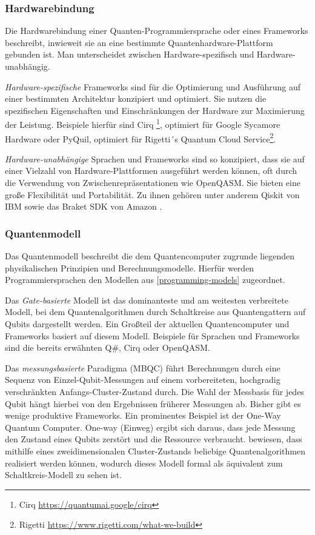 \subsubsection*{Hardwarebindung}

Die Hardwarebindung einer Quanten-Pro\-gram\-mier\-sprache oder eines Frameworks beschreibt, inwieweit sie an eine bestimmte Quanten\-hardware-Plattform gebunden ist. Man unterscheidet zwischen Hardware-spezifisch und Hardware-unabhängig.

\textit{Hardware-spezifische} Frameworks sind für die Optimierung und Ausführung auf einer bestimmten Architektur konzipiert und optimiert. Sie nutzen die spezifischen Eigenschaften und Einschränkungen der Hardware zur Maximierung der Leistung. Beispiele hierfür sind Cirq \footnote{Cirq \url{https://quantumai.google/cirq}}, optimiert für Google Sycamore Hardware oder PyQuil, optimiert für Rigetti´s Quantum Cloud Service\footnote{Rigetti \url{https://www.rigetti.com/what-we-build}}. 

\textit{Hardware-unabhängige} Sprachen und Frameworks sind so konzipiert, dass sie auf einer Vielzahl von Hardware-Plattformen ausgeführt werden können, oft durch die Verwendung von Zwischenrepräsentationen wie OpenQASM. Sie bieten eine große Flexibilität und Portabilität. Zu ihnen gehören unter anderem Qiskit von IBM sowie das Braket SDK von Amazon \autocite{ferreiraExploratoryStudyUsage2025}.

\subsubsection*{Quantenmodell}

Das Quantenmodell beschreibt die dem Quantencomputer zugrunde liegenden physikalischen Prinzipien und Berechnungsmodelle. Hierfür werden Programmiersprachen den Modellen aus \autoref{programming-models} zugeordnet.

Das \textit{Gate-basierte} Modell ist das dominanteste und am weitesten verbreitete Modell, bei dem Quantenalgorithmen durch Schaltkreise aus Quantengattern auf Qubits dargestellt werden. Ein Großteil der aktuellen Quantencomputer und Frameworks basiert auf diesem Modell. Beispiele für Sprachen und Frameworks sind die bereits erwähnten Q\#, Cirq oder OpenQASM. \autocite{ferreiraExploratoryStudyUsage2025}

Das \textit{messungsbasierte} Paradigma (MBQC) führt Berechnungen durch eine Sequenz von Einzel-Qubit-Messungen auf einem vorbereiteten, hochgradig verschränkten Anfangs-Cluster-Zustand durch. Die Wahl der Messbasis für jedes Qubit hängt hierbei von den Ergebnissen früherer Messungen ab. Bisher gibt es wenige produktive Frameworks. Ein prominentes Beispiel ist der One-Way Quantum Computer. One-way (Einweg) ergibt sich daraus, dass jede Messung den Zustand eines Qubits zerstört und die Ressource verbraucht. \citeauthor{briegelMeasurementbasedQuantumComputation2009} bewiesen, dass mithilfe eines zweidimensionalen Cluster-Zustands beliebige Quantenalgorithmen realisiert werden können, wodurch dieses Modell formal als äquivalent zum Schaltkreis-Modell zu sehen ist. \autocite{briegelMeasurementbasedQuantumComputation2009}

